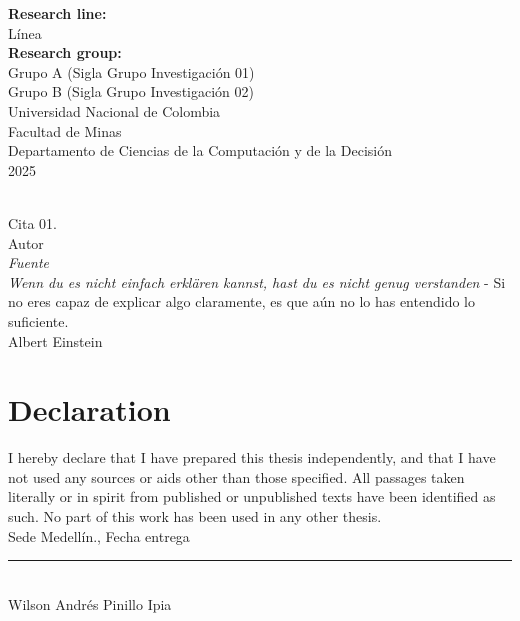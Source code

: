 \documentclass[10pt,english,fleqn,openany,twoside,letterpaper]{book}
\newcommand{\studentname}{}
\newcommand{\submissiondate}{}
\newcommand{\resgroupone}{}
\newcommand{\resgrouptwo}{}
\newcommand{\researchtopic}{}
\newcommand{\codirector}{} %
\newcommand{\codirectortitle}{} %
\newcommand{\issuedate}{}
\newcommand{\sede}{}
\newcommand{\department}{}
\newcommand{\faculty}{}
\newcommand{\university}{Universidad Nacional de Colombia}
\renewcommand{\studentname}{Wilson Andrés Pinillo Ipia}
\renewcommand{\issuedate}{2025}
\renewcommand{\submissiondate}{Fecha entrega}
\renewcommand{\resgroupone}{Grupo A (Sigla Grupo Investigación 01) }
\renewcommand{\resgrouptwo}{Grupo B (Sigla Grupo Investigación 02) }
\renewcommand{\researchtopic}{Línea}
\renewcommand{\sede}{Sede Medellín}
\renewcommand{\department}{Departamento de Ciencias de la Computación y de la Decisión}
\renewcommand{\faculty}{Facultad de Minas}
\begin{document}
{\begin{center}
\vspace{0.5cm}
\textbf{Research line:} \\ 
\researchtopic\\
\textbf{Research group:} \\
\resgroupone \\
\resgrouptwo \\
\vspace{1.5cm} 
\university \\
\faculty \\
\department \\
\issuedate
\end{center}

\newpage
\thispagestyle{empty}
\begin{flushright}
\begin{minipage}{12.5cm}
\noindent
\\[10em]
{\Large Cita 01.}
\\[3em]
Autor
\\ \textit{Fuente}
\\[10em]
{\Large \textit{Wenn du es nicht einfach erkl\"{a}ren kannst, hast du es nicht genug verstanden} - Si no eres capaz de explicar algo claramente, es que aún no lo has entendido lo suficiente.}
\\[3em]
Albert Einstein
\end{minipage}
\end{flushright} 


\newpage
\chapter*{\sffamily Declaration}
\par I hereby declare that I have prepared this thesis independently, and that I have not used any sources or aids other than those specified. All passages taken literally or in spirit from published or unpublished texts have been identified as such. No part of this work has been used in any other thesis.
\\[1em]
\sede., \submissiondate
\\[6em]
\rule{6cm}{0.5pt}\\
\studentname
}
\end{document}
